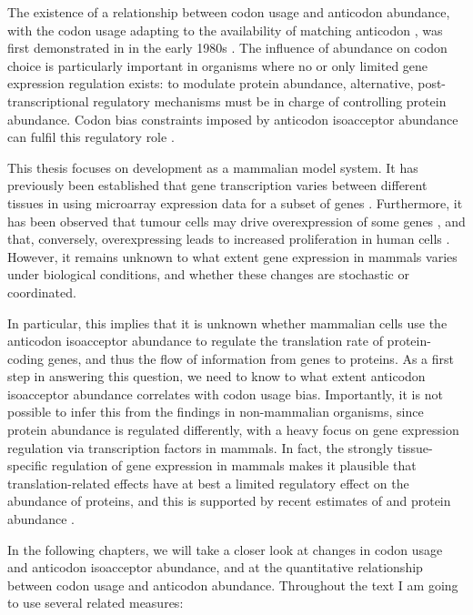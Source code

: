 The existence of a relationship between codon usage and anticodon abundance,
with the codon usage adapting to the availability of matching anticodon
\trna[s], was first demonstrated in  in the early 1980s
\citep{Ikemura:1981,Ikemura:1981a,Ikemura:1985}. The influence of \trna
abundance on codon choice is particularly important in organisms where no or
only limited gene expression regulation exists: to modulate protein abundance,
alternative, post-transcriptional regulatory mechanisms must be in charge of
controlling protein abundance. Codon bias constraints imposed by \trna anticodon
isoacceptor abundance can fulfil this regulatory role \citep{Horn:2008}.

This thesis focuses on \mmu development as a mammalian model system. It has
previously been established that \trna gene transcription varies between
different tissues in \hsa using microarray expression data for a subset of \trna
genes \citep{Dittmar:2006}. Furthermore, it has been observed that tumour cells
may drive overexpression of some \trna genes
\citep{Winter:2000,Pavon-Eternod:2009}, and that, conversely, overexpressing
 leads to increased proliferation in human cells
\citep{Pavon-Eternod:2013}. However, it remains unknown to what extent \trna
gene expression in mammals varies under biological conditions, and whether these
changes are stochastic or coordinated.

In particular, this implies that it is unknown whether mammalian cells use the
\trna anticodon isoacceptor abundance to regulate the translation rate of
protein-coding genes, and thus the flow of information from genes to proteins.
As a first step in answering this question, we need to know to what extent \trna
anticodon isoacceptor abundance correlates with codon usage bias. Importantly,
it is not possible to infer this from the findings in non-mammalian organisms,
since protein abundance is regulated differently, with a heavy focus on gene
expression regulation via transcription factors in mammals. In fact, the
strongly tissue-specific regulation of gene expression in mammals makes it
plausible that translation-related effects have at best a limited regulatory
effect on the abundance of proteins, and this is supported by recent estimates
of \mrna and protein abundance \citep{Li:2014,Csardi:2014,Jovanovic:2015}.

In the following chapters, we will take a closer look at changes in codon usage
and \trna anticodon isoacceptor abundance, and at the quantitative relationship
between codon usage and anticodon abundance. Throughout the text I am going to
use several related measures:


